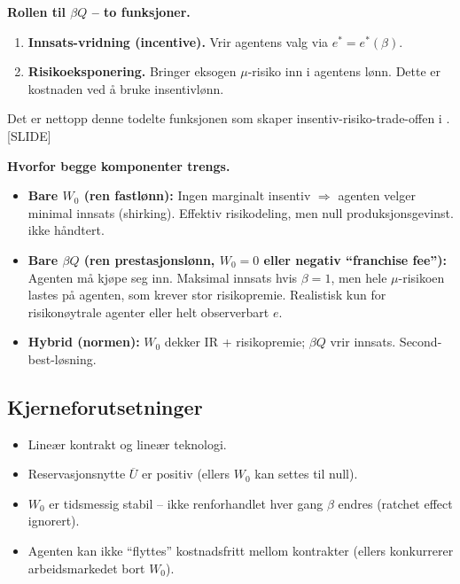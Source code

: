 \textbf{Rollen til $\beta Q$ -- to funksjoner.}
\begin{enumerate}\setlength{\itemsep}{1pt}
\item \textbf{Innsats-vridning (incentive).} Vrir agentens valg via $e^{*}=e^{*}(\beta)$.
\item \textbf{Risikoeksponering.} Bringer eksogen $\mu$-risiko inn i agentens lønn. Dette er kostnaden ved å bruke insentivlønn.
\end{enumerate}
Det er nettopp denne todelte funksjonen som skaper insentiv-risiko-trade-offen i . [SLIDE]

\textbf{Hvorfor begge komponenter trengs.}
\begin{itemize}\setlength{\itemsep}{1pt}
\item \textbf{Bare $W_0$ (ren fastlønn):} Ingen marginalt insentiv $\Rightarrow$ agenten velger minimal innsats (shirking). Effektiv risikodeling, men null produksjonsgevinst.  ikke håndtert.
\item \textbf{Bare $\beta Q$ (ren prestasjonslønn, $W_0=0$ eller negativ ``franchise fee''):} Agenten må kjøpe seg inn. Maksimal innsats hvis $\beta=1$, men hele $\mu$-risikoen lastes på agenten, som krever stor risikopremie. Realistisk kun for risikonøytrale agenter eller helt observerbart $e$.
\item \textbf{Hybrid (normen):} $W_0$ dekker IR + risikopremie; $\beta Q$ vrir innsats. Second-best-løsning.
\end{itemize}

\subsection*{Kjerneforutsetninger}
\begin{itemize}\setlength{\itemsep}{1pt}
\item Lineær kontrakt og lineær teknologi.
\item Reservasjonsnytte $\overline{U}$ er positiv (ellers $W_0$ kan settes til null).
\item $W_0$ er tidsmessig stabil -- ikke renforhandlet hver gang $\beta$ endres (ratchet effect ignorert).
\item Agenten kan ikke ``flyttes'' kostnadsfritt mellom kontrakter (ellers konkurrerer arbeidsmarkedet bort $W_0$).
\end{itemize}

